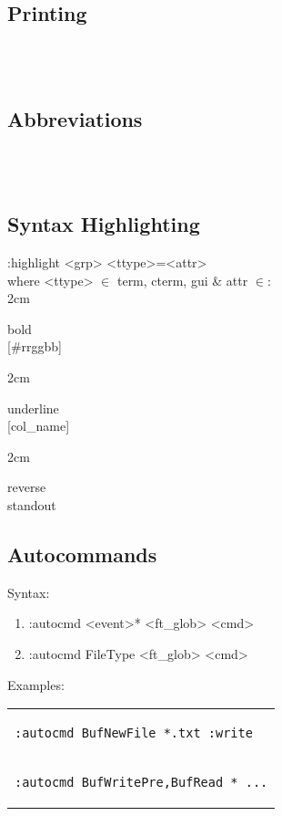 \subsection*{Printing}

\\
\\


\subsection*{Abbreviations}

\\
\\

\subsection*{Syntax Highlighting}
:highlight <grp> <ttype>=<attr> \\
where <ttype> $\in$ term, cterm, gui \& attr $\in$: \\

\api
{2cm}{
bold    \\
{[\#rrggbb]}

}
{2cm}{
underline   \\
{[col\_name]}

}
{2cm}{
reverse     \\
standout

}
\stopapi

\subsection*{Autocommands}
Syntax:
\begin{enumerate}
    \item :autocmd <event>* <ft\_glob> <cmd>
    \item :autocmd FileType <ft\_glob> <cmd>
\end{enumerate}
Examples:\\
\begin{tabular}{l}

\begin{lstlisting}
:autocmd BufNewFile *.txt :write
\end{lstlisting} \\

\begin{lstlisting}
:autocmd BufWritePre,BufRead * ...
\end{lstlisting} \\

\end{tabular}

